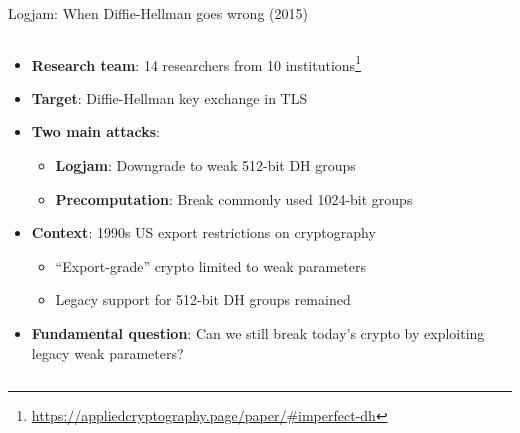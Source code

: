 \documentclass[aspectratio=169, lualatex, handout]{beamer}
\begin{document}
\begin{frame}{Logjam: When Diffie-Hellman goes wrong (2015)}
	\begin{columns}[c]
		\begin{column}{1\textwidth}
			\begin{itemize}
				\item \textbf{Research team}: 14 researchers from 10 institutions\footnote{\url{https://appliedcryptography.page/paper/\#imperfect-dh}}
				\item \textbf{Target}: Diffie-Hellman key exchange in TLS
				\item \textbf{Two main attacks}:
				      \begin{itemize}
					      \item \textbf{Logjam}: Downgrade to weak 512-bit DH groups
					      \item \textbf{Precomputation}: Break commonly used 1024-bit groups
				      \end{itemize}
				\item \textbf{Context}: 1990s US export restrictions on cryptography
				      \begin{itemize}
					      \item ``Export-grade'' crypto limited to weak parameters
					      \item Legacy support for 512-bit DH groups remained
				      \end{itemize}
				\item \textbf{Fundamental question}: Can we still break today's crypto by exploiting legacy weak parameters?
			\end{itemize}
		\end{column}
	\end{columns}
\end{frame}
\end{document}
